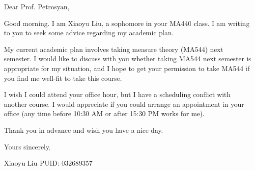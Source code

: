 Dear Prof. Petrosyan,
 
Good morning.
I am Xiaoyu Liu, a sophomore in your MA440 class. I am writing to you to seek some advice regarding my academic plan.
 
My current academic plan involves taking measure theory (MA544) next semester. I would like to discuss with you whether taking MA544 next semester is appropriate for my situation, and I hope to get your permission to take MA544 if you find me well-fit to take this course.
 
I wish I could attend your office hour, but I have a scheduling conflict with another course. I would appreciate if you could arrange an appointment in your office (any time before 10:30 AM or after 15:30 PM works for me).
 
Thank you in advance and wish you have a nice day.
 
 
Yours sincerely,
 
Xiaoyu Liu
PUID: 032689357

